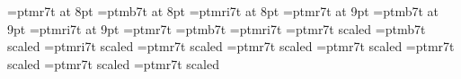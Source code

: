 %
\immediate{}
%
\font\eightrm=ptmr7t at 8pt
\font\eightbf=ptmb7t at 8pt
\font\eightit=ptmri7t at 8pt
%
\font\ninerm=ptmr7t at 9pt
\font\ninebf=ptmb7t at 9pt
\font\nineit=ptmri7t at 9pt
%
\font\tenrm=ptmr7t
\font\tenbf=ptmb7t
\font\tenit=ptmri7t
%
\font\twelverm=ptmr7t scaled 
\font\twelvebf=ptmb7t scaled 
\font\twelveit=ptmri7t scaled 
%
\font\bigfont=ptmr7t scaled  %
\font\Bigfont=ptmr7t scaled  %
\font\BIgfont=ptmr7t scaled  %
\font\BIGfont=ptmr7t scaled  %
%
\ifx\pmxversion\undefined\relax\else
  \font\Bigfont=ptmr7t scaled  %
  \font\BIGfont=ptmr7t scaled  %
\fi
%
\normtype
\endinput
